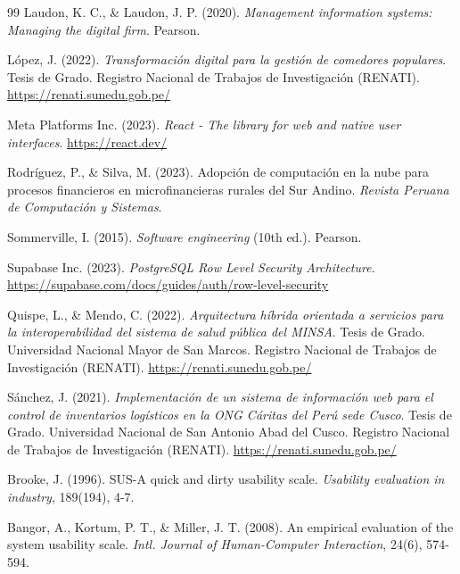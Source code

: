 \documentclass[11pt,a4paper,oneside]{report}
\begin{document}
\begin{thebibliography}{99}
Laudon, K. C., \& Laudon, J. P. (2020). \textit{Management information systems: Managing the digital firm}. Pearson.

L\'opez, J. (2022). \textit{Transformaci\'on digital para la gesti\'on de comedores populares}. Tesis de Grado. Registro Nacional de Trabajos de Investigaci\'on (RENATI). \url{https://renati.sunedu.gob.pe/}

Meta Platforms Inc. (2023). \textit{React - The library for web and native user interfaces}. \url{https://react.dev/}

Rodr\'iguez, P., \& Silva, M. (2023). Adopci\'on de computaci\'on en la nube para procesos financieros en microfinancieras rurales del Sur Andino. \textit{Revista Peruana de Computaci\'on y Sistemas}.

Sommerville, I. (2015). \textit{Software engineering} (10th ed.). Pearson.

Supabase Inc. (2023). \textit{PostgreSQL Row Level Security Architecture}. \url{https://supabase.com/docs/guides/auth/row-level-security}

Quispe, L., \& Mendo, C. (2022). \textit{Arquitectura h\'ibrida orientada a servicios para la interoperabilidad del sistema de salud p\'ublica del MINSA}. Tesis de Grado. Universidad Nacional Mayor de San Marcos. Registro Nacional de Trabajos de Investigaci\'on (RENATI). \url{https://renati.sunedu.gob.pe/}

S\'anchez, J. (2021). \textit{Implementaci\'on de un sistema de informaci\'on web para el control de inventarios log\'isticos en la ONG C\'aritas del Per\'u sede Cusco}. Tesis de Grado. Universidad Nacional de San Antonio Abad del Cusco. Registro Nacional de Trabajos de Investigaci\'on (RENATI). \url{https://renati.sunedu.gob.pe/}

Brooke, J. (1996). SUS-A quick and dirty usability scale. \textit{Usability evaluation in industry}, 189(194), 4-7.

Bangor, A., Kortum, P. T., \& Miller, J. T. (2008). An empirical evaluation of the system usability scale. \textit{Intl. Journal of Human-Computer Interaction}, 24(6), 574-594.


\end{thebibliography}
\end{document}
